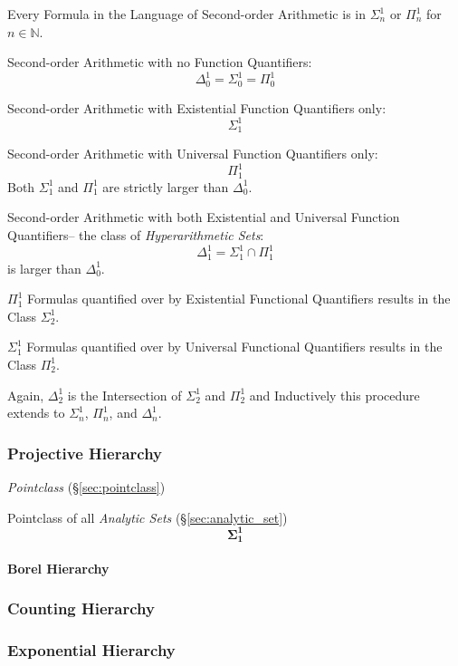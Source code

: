 Every Formula in the Language of Second-order Arithmetic is in
$\Sigma^1_n$ or $\Pi^1_n$ for $n \in \mathbb{N}$.

Second-order Arithmetic with no Function Quantifiers:
\[
  \Delta^1_0 = \Sigma^1_0 = \Pi^1_0
\]

Second-order Arithmetic with Existential Function Quantifiers only:
\[
  \Sigma^1_1
\]

Second-order Arithmetic with Universal Function Quantifiers only:
\[
  \Pi^1_1
\]
Both $\Sigma^1_1$ and $\Pi^1_1$ are strictly larger than $\Delta^1_0$.

Second-order Arithmetic with both Existential and Universal Function
Quantifiers-- the class of \emph{Hyperarithmetic Sets}:
\[
  \Delta^1_1 = \Sigma^1_1 \cap \Pi^1_1
\]
is larger than $\Delta^1_0$.

$\Pi^1_1$ Formulas quantified over by Existential Functional
Quantifiers results in the Class $\Sigma^1_2$.

$\Sigma^1_1$ Formulas quantified over by Universal Functional
Quantifiers results in the Class $\Pi^1_2$.

Again, $\Delta^1_2$ is the Intersection of $\Sigma^1_2$ and $\Pi^1_2$
and Inductively this procedure extends to $\Sigma^1_n$, $\Pi^1_n$, and
$\Delta^1_n$.



\subsubsection{Projective Hierarchy}\label{sec:projective_hierarchy}

\emph{Pointclass} (\S\ref{sec:pointclass})

Pointclass of all \emph{Analytic Sets} (\S\ref{sec:analytic_set})
\[
  \mathbf{\Sigma^1_1}
\]

\paragraph{Borel Hierarchy}



\subsubsection{Counting Hierarchy}

\subsubsection{Exponential Hierarchy}

